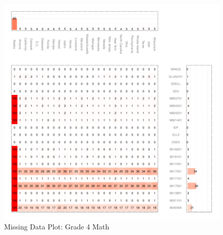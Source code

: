 \documentclass[letterpaper,12p,twoside]{article} %
\begin{document}
\begin{figure}[ht]
\begin{center}
\includegraphics[width=\textwidth]{../Figures2009/g4math-missing.pdf}
\caption{Missing Data Plot: Grade 4 Math}
\label{fig:g4math:missing}
\end{center}
\end{figure}
\end{document}
